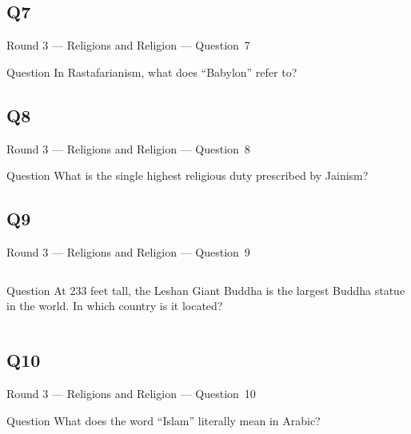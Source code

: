 \documentclass[11pt]{beamer}
\begin{document}
\subsection*{Q7}
\begin{frame}[t]{Round 3 --- Religions and Religion --- \mbox{Question 7}}
\vspace{-0.5em}
\begin{block}{Question}
In Rastafarianism, what does ``Babylon'' refer to?
\end{block}
\end{frame}
\subsection*{Q8}
\begin{frame}[t]{Round 3 --- Religions and Religion --- \mbox{Question 8}}
\vspace{-0.5em}
\begin{block}{Question}
What is the single highest religious duty prescribed by Jainism?
\end{block}
\end{frame}
\subsection*{Q9}
\begin{frame}[t]{Round 3 --- Religions and Religion --- \mbox{Question 9}}
\vspace{-0.5em}
\begin{columns}[T,totalwidth=\linewidth]
\begin{column}{0.32\linewidth}
\begin{block}{Question}
At 233 feet tall, the Leshan Giant Buddha is the largest Buddha statue in the world. In which country is it located?
\end{block}
\end{column}
\begin{column}{0.65\linewidth}
\begin{center}
\texttt{[image: \{Images/leshan]}.jpg}
\end{center}
\end{column}
\end{columns}
\end{frame}
\subsection*{Q10}
\begin{frame}[t]{Round 3 --- Religions and Religion --- \mbox{Question 10}}
\vspace{-0.5em}
\begin{block}{Question}
What does the word ``Islam'' literally mean in Arabic?
\end{block}
\end{frame}
\end{document}

